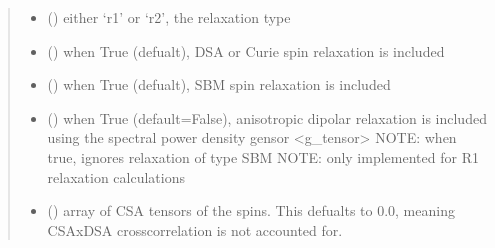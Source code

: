 \documentclass[a4paper,10pt,english,openany,oneside]{sphinxmanual}
\begin{document}
\begin{fulllineitems}
\begin{fulllineitems}
\begin{fulllineitems}
\begin{quote}
\begin{description}
\begin{itemize}
\item {} 
\sphinxAtStartPar
{} () \textendash{} either ‘r1’ or ‘r2’, the relaxation type

\item {} 
\sphinxAtStartPar
{} (\sphinxstyleliteralemphasis{\sphinxupquote{ (}}\sphinxstyleliteralemphasis{\sphinxupquote{)}}) \textendash{} when True (defualt), DSA or Curie spin relaxation is included

\item {} 
\sphinxAtStartPar
{} (\sphinxstyleliteralemphasis{\sphinxupquote{ (}}\sphinxstyleliteralemphasis{\sphinxupquote{)}}) \textendash{} when True (defualt), SBM spin relaxation is included

\item {} 
\sphinxAtStartPar
{} (\sphinxstyleliteralemphasis{\sphinxupquote{ (}}\sphinxstyleliteralemphasis{\sphinxupquote{)}}) \textendash{} when True (default=False), anisotropic dipolar relaxation is
included using the spectral power density gensor \textless{}g\_tensor\textgreater{}
NOTE: when true, ignores relaxation of type SBM
NOTE: only implemented for R1 relaxation calculations

\item {} 
\sphinxAtStartPar
{} (\sphinxstyleliteralemphasis{\sphinxupquote{ (}}\sphinxstyleliteralemphasis{\sphinxupquote{,}}\sphinxstyleliteralemphasis{\sphinxupquote{,}}\sphinxstyleliteralemphasis{\sphinxupquote{) }}\sphinxstyleliteralemphasis{\sphinxupquote{(}}\sphinxstyleliteralemphasis{\sphinxupquote{)}}) \textendash{} array of CSA tensors of the spins.
This defualts to 0.0, meaning CSAxDSA crosscorrelation is
not accounted for.

\end{itemize}


\end{description}
\end{quote}
\end{fulllineitems}
\end{fulllineitems}
\end{fulllineitems}
\end{document}
